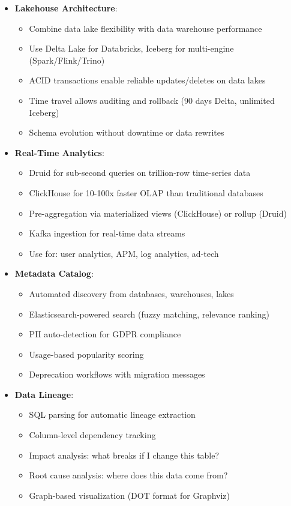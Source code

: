 \begin{itemize}
    \item \textbf{Lakehouse Architecture}:
    \begin{itemize}
        \item Combine data lake flexibility with data warehouse performance
        \item Use Delta Lake for Databricks, Iceberg for multi-engine (Spark/Flink/Trino)
        \item ACID transactions enable reliable updates/deletes on data lakes
        \item Time travel allows auditing and rollback (90 days Delta, unlimited Iceberg)
        \item Schema evolution without downtime or data rewrites
    \end{itemize}

    \item \textbf{Real-Time Analytics}:
    \begin{itemize}
        \item Druid for sub-second queries on trillion-row time-series data
        \item ClickHouse for 10-100x faster OLAP than traditional databases
        \item Pre-aggregation via materialized views (ClickHouse) or rollup (Druid)
        \item Kafka ingestion for real-time data streams
        \item Use for: user analytics, APM, log analytics, ad-tech
    \end{itemize}

    \item \textbf{Metadata Catalog}:
    \begin{itemize}
        \item Automated discovery from databases, warehouses, lakes
        \item Elasticsearch-powered search (fuzzy matching, relevance ranking)
        \item PII auto-detection for GDPR compliance
        \item Usage-based popularity scoring
        \item Deprecation workflows with migration messages
    \end{itemize}

    \item \textbf{Data Lineage}:
    \begin{itemize}
        \item SQL parsing for automatic lineage extraction
        \item Column-level dependency tracking
        \item Impact analysis: what breaks if I change this table?
        \item Root cause analysis: where does this data come from?
        \item Graph-based visualization (DOT format for Graphviz)
    \end{itemize}
\end{itemize}

